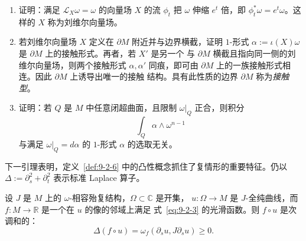\begin{exercise}\label{ex:9-2-9}
\begin{enumerate}[label=\textup{(\roman*)}]
\item 证明：满足 $\mathcal L_X\omega=\omega$ 的向量场 $X$ 的流 $\phi_t$ 把 $\omega$ 伸缩
$e^t$ 倍，即 $\phi_t^*\omega=e^t\omega$。这样的 $X$ 称为刘维尔向量场。

\item 若刘维尔向量场 $X$ 定义在 $\partial M$ 附近并与边界横截，证明
$1$-形式 $\alpha:=\iota(X)\omega$ 是 $\partial M$ 上的接触形式。再者，若 $X'$ 是另一个
与 $\partial M$ 横截且指向同一侧的刘维尔向量场，则两个接触形式 $\alpha,\alpha'$
同痕，即可由 $\partial M$ 上的一族接触形式相连。因此 $\partial M$ 上诱导出唯一的接触
结构。具有此性质的边界 $\partial M$ 称为\emph{接触型}。

\item 证明：若 $Q$ 是 $M$ 中任意闭超曲面，且限制 $\omega|_Q$ 正合，则积分
\[
  \int_Q\alpha\wedge\omega^{n-1}
\]
与满足 $\omega|_Q=d\alpha$ 的 $1$-形式 $\alpha$ 的选取无关。
\end{enumerate}
\end{exercise}

下一引理表明，定义~\ref{def:9-2-6} 中的凸性概念抓住了复情形的重要特征。仍以
$\Delta:=\partial_s^2+\partial_t^2$ 表示标准 Laplace 算子。

\begin{lemma}\label{lem:9-2-10}
设 $J$ 是 $M$ 上的 $\omega$-相容殆复结构，$\Omega\subset\mathbb C$ 是开集，
$u:\Omega\to M$ 是 $J$-全纯曲线，而 $f:M\to\mathbb R$ 是一个在 $u$ 的像的邻域上满足
式~\eqref{eq:9-2-3} 的光滑函数。则 $f\circ u$ 是次调和的：
\[
  \Delta(f\circ u)=\omega_f(\partial_su,J\partial_su)\ge0.
\]
\end{lemma}

